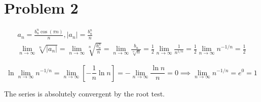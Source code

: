 \documentclass[preview, margin=0.6in]{standalone}
\newcommand*{\problem}[1]{\section*{Problem #1}}
\begin{document}
\problem{2}
\begin{gather*}
    a_n=\frac{b_n^n\cos(\pi n)}{n},
	|a_n|=\frac{b_n^n}{n} \\
	\lim_{n\to\infty}\sqrt[n]{|a_n|}
	=\lim_{n\to\infty}\sqrt[n]{\frac{b_n^n}{n}}
	=\lim_{n\to\infty} \frac{b_n}{\sqrt[n]{n}}
	=\frac12 \lim_{n\to\infty}\frac{1}{n^{1/n}}
	=\frac12 \lim_{n\to\infty} n^{-1/n}=\frac12
\end{gather*}
\begin{mdframed}
	\begin{equation*}
		\ln\lim_{n\to\infty}n^{-1/n}
		=\lim_{n\to\infty}\left[-\frac1n \ln n\right]
		=-\lim_{n\to \infty}\frac{\ln n}{n}
		=0
		\implies \lim_{n\to\infty}n^{-1/n}
		=e^0=1
	\end{equation*}
\end{mdframed}

The series is absolutely convergent by the root test.
\end{document}
